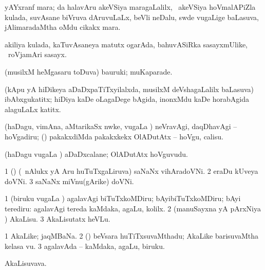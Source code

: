 \bentry
{} 
\gl{\nA} 
\bmng
yAYxranf mara; \AseTxrXV da halavAru akeVSiya maragaLalilx, \kanmu\ akeVSiya hoVmalAPiZla kulada, suvAsane biVruva dAruvuLaLx, beVli neDalu, swde \mo vugaLige baLasuva, jAlimaradaMtha oMdu cikakx mara.
\emng
\eentry

\bentry
{} 
\gl{\nA} 
\bmng
akiliya kulada, kaTuvAsaneya matutx ogarAda, bahuvASiRka sasayxmUlike, \kanmu\ roVjamAri sasayx.
\emng
\eentry

\bentry
{} 
\gl{\nA} 
\bmng
(musilxM heMgasaru toDuva) bauruki; muKaparade.
\emng 
\eentry

\bentry
{} 
\gl{\nA}
\bmng
(kApu yA hiDikeya aDaDxpaTiTxyilalxda, musilxM deVshagaLalilx baLasuva) ibAbxgukatitx; hiDiya kaDe oLagaDege bAgida, inonxMdu kaDe horabAgida alaguLaLx katitx. \quad {}
\emng
\eentry

\bentry
{} 
\gl{\akirx} 
\bmng
(haDagu, vimAna, aMtarikaSx nwke, \mo vugaLa \vi) neVravAgi, daqDhavAgi -- hoVgadiru; (\kanmu) pakakxdiMda pakakxkekx OlADutAtx -- hoVgu, calisu.
\emng
\eentry

\bentry
{} 
\gl{\nA}
\bmng
(haDagu \mo vugaLa \vi) aDaDxcalane; OlADutAtx hoVguvudu.
\emng 
\eentry

\bentry
{} 
\gl{\nA}
\bmng
\bnum
\num{1} (\ca) (\kanmu\ nAlukx yA Aru huTuTxgaLiruva) saNaNx vihAradoVNi.
\num{2} eraDu kUveya doVNi. 
\num{3} saNaNx miVnu(gArike) doVNi. \quad  {}
\enum
\emng
\eentry

\bentry
{}  
\gl{\akirx}
\bmng
\bnum
\num{1} (biruku \mo vugaLa \vi) agalavAgi biTuTxkoMDiru; bAyibiTuTxkoMDiru; bAyi terediru:   agalavAgi tereda kaMdaka, agaLu, kolilx. 
\num{2} (manuSayxna yA pArxNiya \vi) AkaLisu. 
\num{3} AkaLisutatx heVLu.
\enum
\emng
\eentry

\bentry
{} 
\gl{\nA} 
\bmng
\bnum
\num{1} AkaLike; jaqMBaNa. 
\num{2} (\AmA) beVsara huTiTxsuvaMthadu; AkaLike barisuvaMtha kelasa \mo vu. 
\num{3} agalavAda -- kaMdaka, agaLu, biruku.
\enum
\emng 
\eentry

\bentry
{} 
\gl{\nA} 
\bmng
AkaLisuvava.
\emng
\eentry

